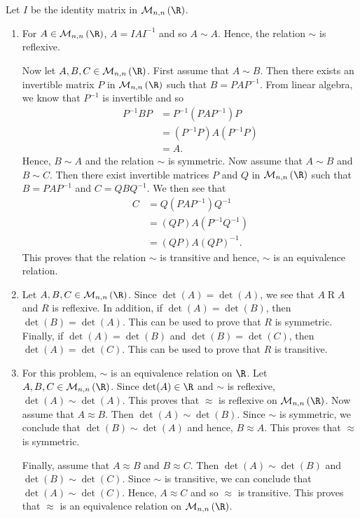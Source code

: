\documentclass[11pt]{article}
\begin{document}
\noindent
Let $I$ be the identity matrix in $\mathcal{M}_{n, n}\left( \R \right)$.
\begin{enumerate}
\item For $A \in \mathcal{M}_{n, n}\left( \R \right)$, $A = IAI^{-1}$ and so $A \sim A$.  Hence, the relation $\sim$ is reflexive.  

Now let $A, B, C \in \mathcal{M}_{n, n}\left( \R \right)$.  First assume that $A \sim B$.  Then there exists an invertible matrix $P$ in $\mathcal{M}_{n, n}\left( \R \right)$ such that $B = PAP^{-1}$.  From linear algebra, we know that $P^{-1}$ is invertible and so
\begin{align*}
P^{-1}BP &= P^{-1} \left( PAP^{-1} \right) P \\
         &= \left( P^{-1}P \right) A \left( P^{-1} P \right) \\
         &= A.
\end{align*}
Hence, $B \sim A$ and the relation $\sim$ is symmetric.  Now assume that $A \sim B$ and 
$B \sim C$.  Then there exist invertible matrices $P$ and $Q$ in 
$\mathcal{M}_{n, n}\left( \R \right)$ such that $B = PAP^{-1}$ and $C = QBQ^{-1}$.  We then see that
\begin{align*}
C &= Q \left( PAP^{-1} \right) Q^{-1} \\
  &= \left(QP \right) A \left( P^{-1} Q^{-1} \right) \\
  &= \left( QP \right) A \left( QP \right)^{-1}.
\end{align*}
This proves that the relation $\sim$ is transitive and hence, $\sim$ is an equivalence relation.

\item Let $A, B, C \in \mathcal{M}_{n, n}\left( \R \right)$.  Since $\det(A) = \det(A)$, we see that $A \mathrel{R} A$ and $R$ is reflexive.  In addition, if $\det(A) = \det(B)$, then $\det(B) = \det(A)$.  This can be used to prove that $R$ is symmetric.  Finally, if 
$\det(A) = \det(B)$ and $\det(B) = \det(C)$, then $\det(A) = \det(C)$.  This can be used to prove that $R$ is transitive.

\item For this problem, $\sim$ is an equivalence relation on $\R$. Let $A, B, C \in \mathcal{M}_{n, n}\left( \R \right)$.  Since $\det(A) \in \R$ and $\sim$ is reflexive, 
$\det(A) \sim \det(A)$.  This proves that $\approx$ is reflexive on 
$\mathcal{M}_{n, n}\left( \R \right)$.  Now assume that $A \approx B$.  Then $\det(A) \sim \det(B)$.  Since $\sim$ is symmetric, we conclude that $\det(B) \sim \det(A)$ and hence, 
$B \approx A$.  This proves that $\approx$ is symmetric.

Finally, assume that $A \approx B$ and $B \approx C$.  Then $\det(A) \sim \det(B)$ and 
$\det(B) \sim \det(C)$.  Since $\sim$ is transitive, we can conclude that 
$\det(A) \sim \det(C)$.  Hence, $A \approx C$ and so $\approx$ is transitive.  This proves that $\approx$ is an equivalence relation on $\mathcal{M}_{n, n}\left( \R \right)$.
\end{enumerate}
\end{document}
